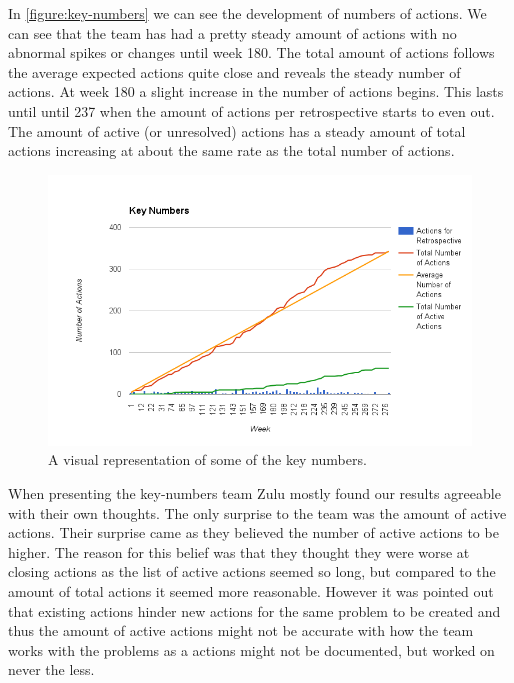 In \autoref{figure:key-numbers} we can see the development of numbers of actions. We can see that the team has had a pretty steady amount of actions with no abnormal spikes or changes until week 180. The total amount of actions follows the average expected actions quite close and reveals the steady number of actions.
At week 180 a slight increase in the number of actions begins. This lasts until until 237 when the amount of actions per retrospective starts to even out. 
The amount of active (or unresolved) actions has a steady amount of total actions increasing at about the same rate as the total number of actions. 

\begin{figure}[!h]
	\centering
	\includegraphics[width=\textwidth, keepaspectratio]{figures/key-numbers.png}
	\caption{A visual representation of some of the key numbers.}
	\label{figure:key-numbers}
\end{figure}

When presenting the key-numbers team Zulu mostly found our results agreeable with their own thoughts. The only surprise to the team was the amount of active actions. Their surprise came as they believed the number of active actions to be higher. The reason for this belief was that they thought they were worse at closing actions as the list of active actions seemed so long, but compared to the amount of total actions it seemed more reasonable. However it was pointed out that existing actions hinder new actions for the same problem to be created and thus the amount of active actions might not be accurate with how the team works with the problems as a actions might not be documented, but worked on never the less. 

